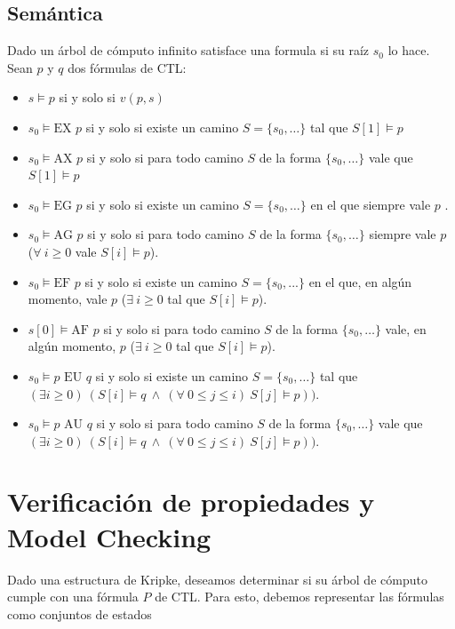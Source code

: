 \subsection{Semántica}
Dado un árbol de cómputo infinito satisface una formula si su raíz $s_0$ lo hace. Sean $p$ y $q$ dos fórmulas de CTL:
\begin{itemize}
    \item $s \vDash p$ si y solo si $v(p,s)$
    \item $s_0 \vDash \text{EX } p$ si y solo si existe un camino $S =\{s_0,\dots\}$ tal que $S[1]\vDash p$
    \item $s_0 \vDash \text{AX } p$ si y solo si para todo camino $S$ de la forma $\{s_0,\dots\}$ vale que $S[1]\vDash p$
    \item $s_0 \vDash \text{EG } p$ si y solo si existe un camino $S =\{s_0,\dots\}$ en el que siempre vale $p$ .
    \item $s_0 \vDash \text{AG } p$ si y solo si para todo camino $S$ de la forma $\{s_0,\dots\}$ siempre vale $p$ ($\forall~i\geq 0$ vale $S[i] \vDash p$).
    \item $s_0 \vDash \text{EF } p$ si y solo si existe un camino $S=\{s_0,...\}$ en el que, en algún momento, vale $p$ ($\exists~i\geq 0$ tal que  $S[i] \vDash p$).
    \item $s[0] \vDash \text{AF } p$ si y solo si para todo camino  $S$ de la forma $\{s_0,\dots\}$ vale, en algún momento, $p$ ($\exists~i\geq 0$ tal que  $S[i] \vDash p$).
    \item $s_0 \vDash p \text{ EU } q$ si y solo si existe un camino $S =\{s_0,\dots\}$ tal que \\\hspace*{1cm} $(\exists i\geq 0)~(S[i] \vDash q~\land~(\forall~ 0\leq j\leq i)~S[j]\vDash p))$.
    \item $s_0 \vDash p \text{ AU } q$ si y solo si para todo camino  $S$ de la forma $\{s_0,\dots\}$ vale que\\\hspace*{1cm} $(\exists i\geq 0)~(S[i] \vDash q~\land~(\forall~ 0\leq j\leq i)~S[j]\vDash p))$.
\end{itemize}

\newpage
\section{Verificación de propiedades y Model Checking}
Dado una estructura de Kripke, deseamos determinar si su árbol de cómputo cumple con una fórmula $P$ de CTL. Para esto, debemos representar las fórmulas como conjuntos de estados


